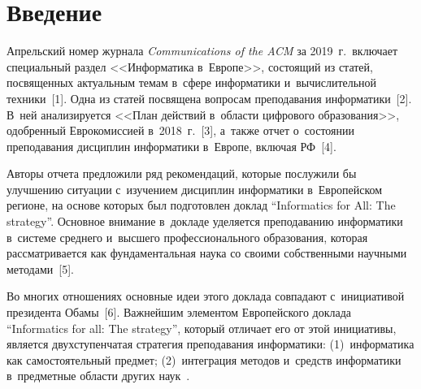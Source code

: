 
  
\vspace*{-3pt}



\thispagestyle{headings}

\begin{multicols}{2}

\label{st\stat}
   
\section{Введение}
    
  Апрельский номер журнала \textit{Communications of the ACM} за 2019~г.\ 
включает специальный раздел <<Информатика в~Европе>>, со\-сто\-ящий из 
статей, посвященных актуальным темам в~сфере информатики 
и~вычислительной техники~[1]. Одна из статей посвящена 
вопросам преподавания информатики~[2]. В~ней анализируется <<План 
действий в~об\-ласти циф\-ро\-во\-го образования>>, одобренный Еврокомиссией 
в~2018~г.~[3], а~так\-же отчет о~со\-сто\-янии преподавания дисциплин 
информатики в~Европе, вклю\-чая РФ~[4].
  
  Авторы отчета предложили ряд рекомендаций, которые послужили бы 
улучшению ситуации с~изуче\-ни\-ем дисциплин информатики в~Европейском 
регионе, на основе которых был подготовлен доклад ``Informatics for All: The 
strategy''. Основное внимание в~докладе уделяется преподаванию 
информатики в~системе среднего и~высшего профессионального образования, 
которая рассматривается как фундаментальная наука со своими собственными 
научными методами~[5].
  
  Во многих отношениях основные идеи этого доклада совпадают 
с~инициативой президента Обамы~[6]. Важнейшим элементом Европейского 
доклада ``Informatics for all: The strategy'', который отличает его от этой 
инициативы, является двухступенчатая стратегия преподавания информатики: 
(1)~информатика как самостоятельный предмет; (2)~интеграция методов 
и~средств информатики в~предметные области других наук~\cite{2-zat}.
  

\end{multicols}
